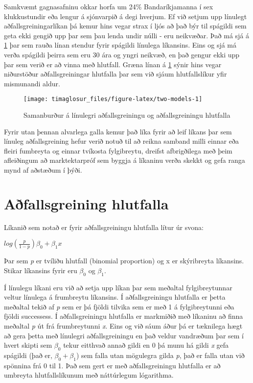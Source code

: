 \documentclass[]{book}
\begin{document}
Samkvæmt gagnasafninu okkar horfa um 24\% Bandaríkjamanna í sex klukkustundir eða lengur á sjónvarpið á degi hverjum. Ef við setjum upp línulegt aðfallsgreiningarlíkan þá kemur hins vegar strax í ljós að það býr til spágildi sem geta ekki gengið upp þar sem þau lenda undir núlli - eru neikvæðar. Það má sjá á \ref{fig:two-models} þar sem rauða línan stendur fyrir spágildi línulega líkansins. Eins og sjá má verða spágildi þeirra sem eru 30 ára og yngri neikvæð, en það gengur ekki upp þar sem verið er að vinna með hlutfall. Græna línan á \ref{fig:two-models} sýnir hins vegar niðurstöður aðfallsgreiningar hlutfalla þar sem við sjáum hlutfallslíkur yfir mismunandi aldur.

\begin{figure}

{\centering \texttt{[image: timaglosur\_files/figure-latex/two-models-1]} 

}

\caption{Samanburður á línulegri aðfallsgreiningu og aðfallsgreiningu hlutfalla}\label{fig:two-models}
\end{figure}

Fyrir utan þennan alvarlega galla kemur það líka fyrir að leif líkans þar sem línuleg aðfallsgreining hefur verið notuð til að reikna samband milli einnar eða fleiri fumbreyta og einnar tvíkosta fylgibreytu, dreifst afbrigðilega með þeim afleiðingum að marktektarpróf sem byggja á líkaninu verða skekkt og gefa ranga mynd af aðstæðum í þýði.

\hypertarget{auxf0fallsgreining-hlutfalla-1}{%
\section{Aðfallsgreining hlutfalla}\label{auxf0fallsgreining-hlutfalla-1}}

Líkanið sem notað er fyrir aðfallsgreiningu hlutfalla lítur úr svona:

\(log(\frac{p}{1-p} ) \beta_{0}+\beta_{1}x\)

Þar sem \emph{p} er tvíliðu hlutfall (binomial proportion) og x er skýribreyta líkansins. Stikar líkansins fyrir eru \(\beta_{0}\) og \(\beta_{1}\).

Í línulegu líkani eru við að setja upp líkan þar sem meðaltal fylgibreytunnar veltur línulega á frumbreytu líkansins. Í aðfallsgreiningu hlutfalla er þetta meðaltal tekið af \emph{p} sem er þá fjöldi tilvika sem er með 1 á fylgibreytunni eða fjöldi successess. Í aðfallsgreiningu hlutfalla er markmiðið með líkaninu að finna meðaltal \emph{p} út frá frumbreytunni \emph{x}. Eins og við sáum áður þá er tæknilega hægt að gera þetta með línulegri aðfallsgreiningu en það veldur vandræðum þar sem í hvert skipti sem \(\beta_{0}\) tekur eitthvað annað gildi en 0 þá munu há gildi \emph{x} gefa spágildi (það er, \(\beta_{0}+\beta_{1}\)) sem falla utan mögulegra gilda \emph{p}, það er falla utan við spönnina frá 0 til 1. Það sem gert er með aðfallsgreiningu hlutfalla er að umbreyta hlutfallslíkunum með náttúrlegum lógarithma.
\end{document}
